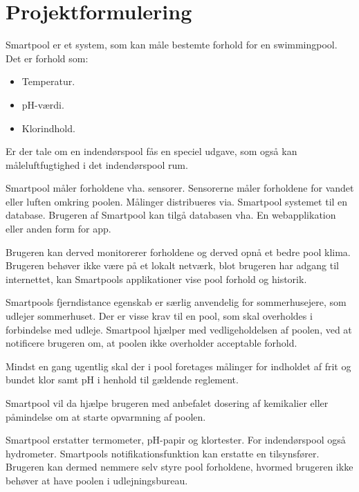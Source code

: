 \section{Projektformulering}

Smartpool er et system, som kan måle bestemte forhold for en swimmingpool. 
Det er forhold som:

\begin{itemize}
	\item Temperatur.
	\item pH-værdi.
	\item Klorindhold.
\end{itemize}

Er der tale om en indendørspool fås en speciel udgave, som også kan måleluftfugtighed i det indendørspool rum.

Smartpool måler forholdene vha. sensorer. Sensorerne måler forholdene for vandet eller luften omkring poolen. Målinger distribueres via. Smartpool systemet til en database. Brugeren af Smartpool kan tilgå databasen vha. En webapplikation eller anden form for app. 

Brugeren kan derved monitorerer forholdene og derved opnå et bedre pool klima. Brugeren behøver ikke være på et lokalt netværk, blot brugeren har adgang til internettet, kan Smartpools applikationer vise pool forhold og historik. 

Smartpools fjerndistance egenskab er særlig anvendelig for sommerhusejere, som udlejer sommerhuset. Der er visse krav til en pool, som skal overholdes i forbindelse med udleje. Smartpool hjælper med vedligeholdelsen af poolen, ved at notificere brugeren om, at poolen ikke overholder acceptable forhold. 

Mindst en gang ugentlig skal der i pool foretages målinger for indholdet af frit og bundet klor samt pH i henhold til gældende reglement.

Smartpool vil da hjælpe brugeren med anbefalet dosering af kemikalier eller påmindelse om at starte opvarmning af poolen.

Smartpool erstatter termometer, pH-papir og klortester. For indendørspool også hydrometer. Smartpools notifikationsfunktion kan erstatte en tilsynsfører. Brugeren kan dermed nemmere selv styre pool forholdene, hvormed brugeren ikke behøver at have poolen i udlejningsbureau.

